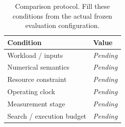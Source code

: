 \begin{table}[t]
\centering
\caption{Comparison protocol. Fill these conditions from the actual frozen evaluation configuration.}
\label{tab:setup}
\begin{tabular}{ll}
\toprule
Condition & Value \\
\midrule
Workload / inputs & \emph{Pending} \\
Numerical semantics & \emph{Pending} \\
Resource constraint & \emph{Pending} \\
Operating clock & \emph{Pending} \\
Measurement stage & \emph{Pending} \\
Search / execution budget & \emph{Pending} \\
\bottomrule
\end{tabular}
\end{table}
